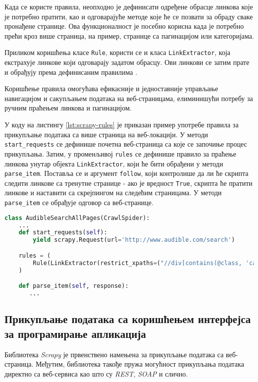 \documentclass[12pt,oneside]{memoir}
\begin{document}
Када се користе правила, неопходно је дефинисати одређене обрасце линкова које је потребно пратити, као и одговарајуће методе које ће се позвати за обраду сваке пронађене странице. Ова функционалност је посебно корисна када је потребно прећи кроз више страница, на пример, странице са пагинацијом или категоријама.

Приликом коришћења класе \texttt{Rule}, користи се и класа \texttt{LinkExtractor}, која екстрахује линкове који одговарају задатом обрасцу. Ови линкови се затим прате и обрађују према дефинисаним правилима \cite{scrapy}.

Коришћење правила омогућава ефикасније и једноставније управљање навигацијом и сакупљањем података на веб-страницама, елиминишући потребу за ручним праћењем линкова и пагинацијом.

У коду на листингу \ref{lst:scrapy-rules} је приказан пример употребе правила за прикупљање података са више страница на веб-локацији. У методи  \texttt{start\_requests}  се дефинише почетна веб-страница са које се започиње процес прикупљања. Затим, у променљивој \texttt{rules} се дефинише правило за праћење линкова унутар објекта \texttt{LinkExtractor}, који ће бити обрађени у методи \texttt{parse\_item}. Поставља се и аргумент \texttt{follow},
који контролише да ли ће скрипта следити линкове са тренутне странице - ако је вредност \texttt{True}, скрипта ће пратити линкове и наставити са скрејпингом на следећим страницама. У методи \texttt{parse\_item} се обрађује одговор са веб-странице.

\begin{lstlisting}[language=Python, caption={Прикупљање података са више страница коришћењем правила}, label={lst:scrapy-rules}]
class AudibleSearchAllPages(CrawlSpider):
    ...
    def start_requests(self):
        yield scrapy.Request(url='http://www.audible.com/search')

    rules = (
        Rule(LinkExtractor(restrict_xpaths=("//div[contains(@class, 'categories')]//a")), callback='parse_item', follow=True),
    )

    def parse_item(self, response):
       ...
\end{lstlisting}

\subsection{Прикупљање података са коришћењем интерфејса за програмирање апликација}
Библиотека \textit{Scrapy} је првенствено намењена за прикупљање података са веб-страница. Међутим, библиотека такође пружа могућност прикупљања података директно са веб-сервиса као што су \textit{REST}, \textit{SOAP} и слично.
\end{document}
